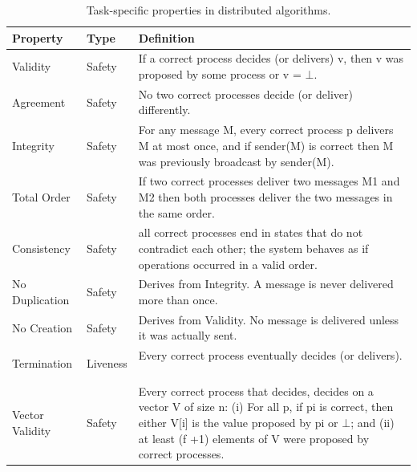 \begin{table}[H]
\centering
\caption{Task-specific properties in distributed algorithms.}
\label{tab:correctness-properties}
\begin{tabular}{|p{2.5cm}|p{2cm}|p{9cm}|}
\hline
\textbf{Property} & \textbf{Type} & \textbf{Definition} \\
\hline

Validity & Safety & If a correct process decides (or delivers) v, then v was proposed by some process or v =  $\bot$. ~\cite{correia2006from} \\
\hline

Agreement & Safety & No two correct processes decide (or deliver) differently. ~\cite{correia2006from} \\
\hline

Integrity & Safety & For any message M, every correct process p delivers M at most once, and if sender(M)  is correct then M was previously broadcast by sender(M). ~\cite{correia2006from} \\
\hline

Total Order & Safety & If two correct processes deliver two messages M1 and M2 then both processes deliver the two messages in the same order. ~\cite{correia2006from}\\
\hline

Consistency & Safety & all correct processes end in states that do not contradict each other; the system behaves as if operations occurred in a valid order. ~\cite{raynal2013distributed} \\
\hline

No Duplication & Safety & Derives from Integrity. A message is never delivered more than once. ~\cite{raynal2013distributed}\\
\hline

No Creation & Safety & Derives from Validity. No message is delivered unless it was actually sent. ~\cite{raynal2013distributed} \\
\hline

Termination & Liveness & Every correct process eventually decides (or delivers). ~\cite{correia2006from} \\
\hline
Vector \newline Validity & Safety & Every correct process that decides, decides on a vector V of size n: (i) For all p, if p{i} is correct, then either V[i] is the value proposed by p{i} or $\bot$; and (ii) at least (f +1) elements of V were proposed by correct processes.~\cite{correia2006from} \\
\hline


\end{tabular}
\end{table}

